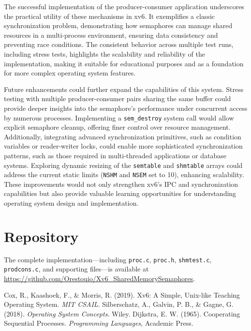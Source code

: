 \documentclass[12pt]{article}
\begin{document}
The successful implementation of the producer-consumer application underscores the practical utility of these mechanisms in xv6. It exemplifies a classic synchronization problem, demonstrating how semaphores can manage shared resources in a multi-process environment, ensuring data consistency and preventing race conditions. The consistent behavior across multiple test runs, including stress tests, highlights the scalability and reliability of the implementation, making it suitable for educational purposes and as a foundation for more complex operating system features.

Future enhancements could further expand the capabilities of this system. Stress testing with multiple producer-consumer pairs sharing the same buffer could provide deeper insights into the semaphore’s performance under concurrent access by numerous processes. Implementing a \texttt{sem\_destroy} system call would allow explicit semaphore cleanup, offering finer control over resource management. Additionally, integrating advanced synchronization primitives, such as condition variables or reader-writer locks, could enable more sophisticated synchronization patterns, such as those required in multi-threaded applications or database systems. Exploring dynamic resizing of the \texttt{semtable} and \texttt{shmtable} arrays could address the current static limits (\texttt{NSHM} and \texttt{NSEM} set to 10), enhancing scalability. These improvements would not only strengthen xv6’s IPC and synchronization capabilities but also provide valuable learning opportunities for understanding operating system design and implementation.

\section{Repository}
The complete implementation—including \texttt{proc.c}, \texttt{proc.h}, \texttt{shmtest.c}, \texttt{prodcons.c}, and supporting files—is available at \\
\url{https://github.com/Orestouio/Xv6_SharedMemorySemaphores}.

\begin{thebibliography}{9}
Cox, R., Kaashoek, F., \& Morris, R. (2019). Xv6: A Simple, Unix-like Teaching Operating System. \textit{MIT CSAIL}.
Silberschatz, A., Galvin, P. B., \& Gagne, G. (2018). \textit{Operating System Concepts}. Wiley.
Dijkstra, E. W. (1965). Cooperating Sequential Processes. \textit{Programming Languages}, Academic Press.
\end{thebibliography}
\end{document}

